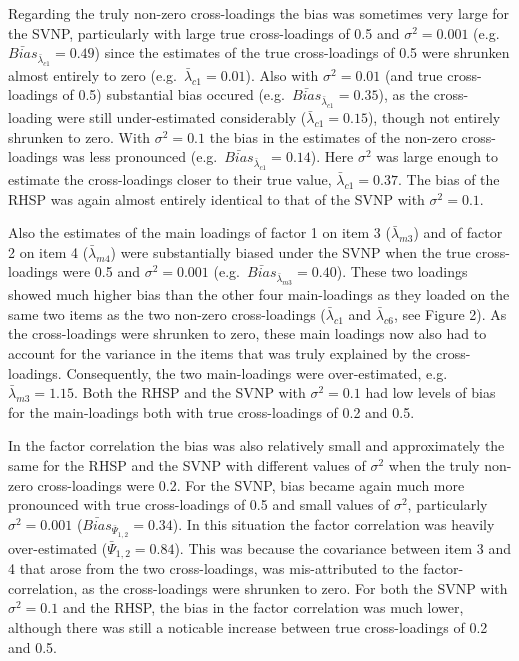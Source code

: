 \documentclass[
  man, donotrepeattitle,floatsintext]{apa6}
\begin{document}
Regarding the truly non-zero cross-loadings the bias was sometimes very large for the SVNP, particularly with large true cross-loadings of 0.5 and \(\sigma^2 = 0.001\) (e.g.~\(\bar{Bias}_{\bar{\lambda}_{c 1}} = 0.49\)) since the estimates of the true cross-loadings of 0.5 were shrunken almost entirely to zero (e.g.~\(\bar{\lambda}_{c 1} = 0.01\)). Also with \(\sigma^2 = 0.01\) (and true cross-loadings of 0.5) substantial bias occured (e.g.~\(\bar{Bias}_{\bar{\lambda}_{c 1}} = 0.35\)), as the cross-loading were still under-estimated considerably (\(\bar{\lambda}_{c 1} = 0.15\)), though not entirely shrunken to zero. With \(\sigma^2 = 0.1\) the bias in the estimates of the non-zero cross-loadings was less pronounced (e.g.~\(\bar{Bias}_{\bar{\lambda}_{c 1}} = 0.14\)). Here \(\sigma^2\) was large enough to estimate the cross-loadings closer to their true value, \(\bar{\lambda}_{c 1} = 0.37\). The bias of the RHSP was again almost entirely identical to that of the SVNP with \(\sigma^2 = 0.1\).

Also the estimates of the main loadings of factor 1 on item 3 (\(\bar{\lambda}_{m 3}\)) and of factor 2 on item 4 (\(\bar{\lambda}_{m 4}\)) were substantially biased under the SVNP when the true cross-loadings were 0.5 and \(\sigma^2 = 0.001\) (e.g.~\(\bar{Bias}_{\bar{\lambda}_{m 3}} = 0.40\)). These two loadings showed much higher bias than the other four main-loadings as they loaded on the same two items as the two non-zero cross-loadings (\(\bar{\lambda}_{c 1}\) and \(\bar{\lambda}_{c 6}\), see Figure 2). As the cross-loadings were shrunken to zero, these main loadings now also had to account for the variance in the items that was truly explained by the cross-loadings. Consequently, the two main-loadings were over-estimated, e.g.~\(\bar{\lambda}_{m 3} = 1.15\). Both the RHSP and the SVNP with \(\sigma^2 = 0.1\) had low levels of bias for the main-loadings both with true cross-loadings of 0.2 and 0.5.

In the factor correlation the bias was also relatively small and approximately the same for the RHSP and the SVNP with different values of \(\sigma^2\) when the truly non-zero cross-loadings were 0.2. For the SVNP, bias became again much more pronounced with true cross-loadings of 0.5 and small values of \(\sigma^2\), particularly \(\sigma^2 = 0.001\) (\(\bar{Bias}_{\bar{\Psi}_{1,2}} = 0.34\)). In this situation the factor correlation was heavily over-estimated (\(\bar{\Psi}_{1,2} = 0.84\)). This was because the covariance between item 3 and 4 that arose from the two cross-loadings, was mis-attributed to the factor-correlation, as the cross-loadings were shrunken to zero. For both the SVNP with \(\sigma^2 = 0.1\) and the RHSP, the bias in the factor correlation was much lower, although there was still a noticable increase between true cross-loadings of 0.2 and 0.5.
\end{document}
